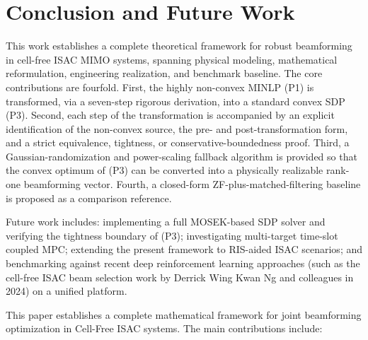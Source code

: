 \documentclass[12pt,a4paper]{article}
\begin{document}
\section{Conclusion and Future Work}

This work establishes a complete theoretical framework for robust beamforming in cell-free ISAC MIMO systems, spanning physical modeling, mathematical reformulation, engineering realization, and benchmark baseline. The core contributions are fourfold. First, the highly non-convex MINLP (P1) is transformed, via a seven-step rigorous derivation, into a standard convex SDP (P3). Second, each step of the transformation is accompanied by an explicit identification of the non-convex source, the pre- and post-transformation form, and a strict equivalence, tightness, or conservative-boundedness proof. Third, a Gaussian-randomization and power-scaling fallback algorithm is provided so that the convex optimum of (P3) can be converted into a physically realizable rank-one beamforming vector. Fourth, a closed-form ZF-plus-matched-filtering baseline is proposed as a comparison reference.

Future work includes: implementing a full MOSEK-based SDP solver and verifying the tightness boundary of (P3); investigating multi-target time-slot coupled MPC; extending the present framework to RIS-aided ISAC scenarios; and benchmarking against recent deep reinforcement learning approaches (such as the cell-free ISAC beam selection work by Derrick Wing Kwan Ng and colleagues in 2024) on a unified platform.

This paper establishes a complete mathematical framework for joint beamforming optimization in Cell-Free ISAC systems. The main contributions include:
\end{document}
